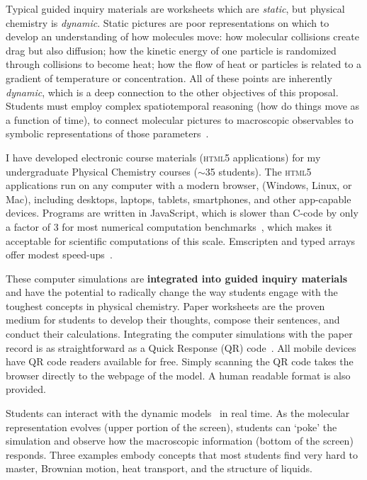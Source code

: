 \documentclass[10pt,letterpaper]{article}
\begin{document}
{

Typical guided inquiry materials are worksheets which are \textit{static}, but physical chemistry is \textit{dynamic}. 
Static pictures are poor representations on which to develop an understanding of how molecules move: how molecular collisions create drag but also diffusion; how the kinetic energy of one particle is randomized through collisions to become heat;
how the flow of heat or particles is related to a gradient of temperature or concentration. All of these points are inherently \textit{dynamic}, which is a deep connection to the other objectives of this proposal. Students must employ complex spatiotemporal reasoning (how do things move as a function of time), to connect molecular pictures to macroscopic observables to symbolic representations of those parameters~\cite{burkeJCE-98,marsonJCE-11}. 


I have developed electronic course materials (\textsc{html5} applications) for my undergraduate Physical Chemistry courses ($\sim$35 students). The \textsc{html5} applications run on any computer with a modern browser, (Windows, Linux, or Mac), including desktops, laptops, tablets, smartphones, and other app-capable devices. Programs are written in JavaScript, which is slower than C-code by only a factor of 3 for most numerical computation benchmarks~\cite{Khan2014}, which makes it acceptable for scientific computations of this scale. Emscripten and typed arrays offer modest speed-ups~\cite{Khan2014}. 

These computer simulations are \textbf{integrated into guided inquiry materials} and have the potential to radically change the way students engage with the toughest concepts in physical chemistry. Paper worksheets are the proven medium for students to develop their thoughts, compose their sentences, and conduct their calculations. Integrating the computer simulations with the paper record is as straightforward as a Quick Response (QR) code~. All mobile devices have QR code readers available for free. Simply scanning the QR code takes the browser directly to the webpage of the model. A human readable format is also provided.

Students can interact with the dynamic models~ in real time. As the molecular representation evolves (upper portion of the screen), students can `poke' the simulation and observe how the macroscopic information (bottom of the screen) responds. Three examples  embody concepts that most students find very hard to master, Brownian motion, heat transport, and the structure of liquids.

}
\end{document}
